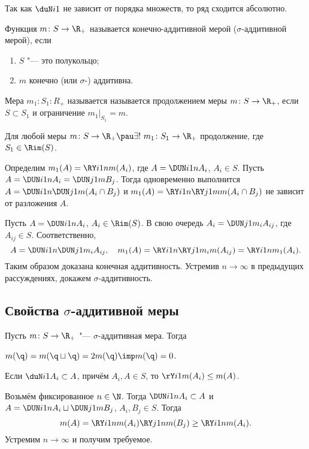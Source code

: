 Так как $\duN i1$ не зависит от порядка множеств, то ряд сходится абсолютно.
\begin{Def}
  Функция $m\colon S\to\R_+$ называется конечно-аддитивной мерой ($\sigma$-аддитивной мерой), если
\begin{enumerate}
  \item $S$ "--- это полукольцо;
  \item $m$ конечно (или $\sigma$-) аддитивна.
\end{enumerate}
\end{Def}

\begin{Def}
  Мера $m_1\colon S_1\colon R_+$ называется называется продолжением меры $m\colon S\to \R_+$, если $S\subset S_1$ и ограничение $m_1\big|_{S_1} = m$.
\end{Def}

\begin{The}
  Для любой меры $m\colon S\to \R_+\pau\exists!\ m_1\colon S_1\to \R_+$ продолжение, где $S_1\in \Rim(S)$.
\end{The}
\begin{Proof}
  Определим $m_1(A) = \RY i1n m(A_i)$, где $A = \DUN i1n A_i$, $A_i\in S$. Пусть $A = \DUN i1n A_i = \DUN j1m B_j$. Тогда одновременно выполнится $A = \DUN i1n\DUN j1m (A_i\cap B_j)$ и $m_1(A) = \RY i1n\RY j1m m(A_i\cap B_j)$ не зависит от разложения $A$.

 Пусть $A = \DUN i1n A_i$, $A_i\in\Rim(S)$. В свою очередь $A_i = \DUN j1{m_i} A_{ij}$, где $A_{ij}\in S$. Соответственно, 
\[
  A = \DUN i1n\DUN j1{m_i}A_{ij},\quad m_1(A) =\RY i1n\RY j1{m_i} m(A_{ij}) = \RY i1nm_1(A_i).
\]
Таким образом доказана конечная аддитивность. Устремив $n\to\infty$  в предыдущих рассуждениях, докажем $\sigma$-аддитивность.
\end{Proof} 

\subsection{Свойства $\sigma$-аддитивной меры}
Пусть $m\colon S\to \R_+$ "--- $\sigma$-аддитивная мера. Тогда
\begin{Ut}
  $m(\q) = m(\q\sqcup \q) = 2m(\q)\imp m(\q) = 0$.
\end{Ut}
\begin{Ut}[монотонность]
  Если $\duN i1 A_i\subset A$, причём $A_i,A\in S$, то $\rY i1m(A_i)\le m(A)$.
\end{Ut}
\begin{Proof}
  Возьмём фиксированное $n\in\N$. Тогда $\DUN i1n A_i\subset A$ и $A = \DUN i1n A_i \sqcup \DUN j1m B_j$, $A_i,B_j\in S$. Тогда
\[
  m(A) = \RY i1n m(A_i)\RY j1n m(B_j) \ge \RY i1n m(A_i).
\]
Устремим $n\to\infty$ и получим требуемое.
\end{Proof}

